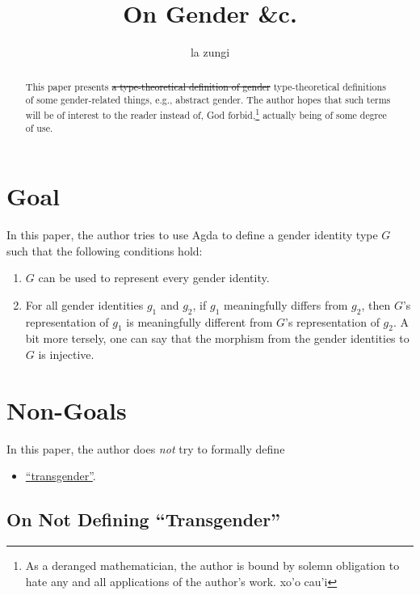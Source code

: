 \documentclass{article}
\title{On Gender \&c.}
\author{la zungi}
\theoremstyle{remark}
\newcommand{\summaryLink}[2]{\hyperref[#1]{#2}}
\begin{document}
\maketitle{}

\begin{abstract}
\sloppypar{}
This paper presents \st{a type-theoretical definition of gender} type-theoretical definitions of some gender-related things, e.g., abstract gender.  The author hopes that such terms will be of interest to the reader instead of, God forbid,\footnote{As a deranged mathematician, the author is bound by solemn obligation to hate any and all applications of the author's work.  xo'o cau'i} actually being of some degree of use.
\end{abstract}

\section{Goal}
In this paper, the author tries to use Agda to define a gender identity type \(G\) such that the following conditions hold:

\begin{enumerate}
  \item \(G\) can be used to represent every gender identity.
  \item For all gender identities \(g_1\) and \(g_2\), if \(g_1\) meaningfully differs from \(g_2\), then \(G\)'s representation of \(g_1\) is meaningfully different from \(G\)'s representation of \(g_2\).  A bit more tersely, one can say that the morphism from the gender identities to \(G\) is injective.\label{enum:specRuleRepresentationDifference}
\end{enumerate}

\section{Non-Goals}
In this paper, the author does \emph{not} try to formally define

\begin{itemize}
  \item \summaryLink{sec:nonGoalTransgender}{``transgender''}.
\end{itemize}

\subsection{On Not Defining ``Transgender''}\label{sec:nonGoalTransgender}
\end{document}
